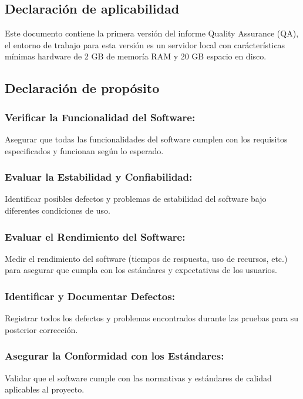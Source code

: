 \documentclass[12pt,letterpaper]{article}
\begin{document}
    \subsection{Declaración de aplicabilidad}
    
    Este documento contiene la primera versión del informe Quality Assurance (QA), el entorno de trabajo para esta versión es un servidor local con carácterísticas mínimas hardware de 2 GB de memoría RAM y 20 GB espacio en disco.
    
    \subsection{Declaración de propósito}

    \subsubsection{Verificar la Funcionalidad del Software:}
        Asegurar que todas las funcionalidades del software cumplen con los requisitos especificados y funcionan según lo esperado.
        
    \subsubsection{Evaluar la Estabilidad y Confiabilidad:}
    Identificar posibles defectos y problemas de estabilidad del software bajo diferentes condiciones de uso.
    
    \subsubsection{Evaluar el Rendimiento del Software:}
    Medir el rendimiento del software (tiempos de respuesta, uso de recursos, etc.) para asegurar que cumpla con los estándares y expectativas de los usuarios.
    
    \subsubsection{Identificar y Documentar Defectos:}
    Registrar todos los defectos y problemas encontrados durante las pruebas para su posterior corrección.
    
    \subsubsection{Asegurar la Conformidad con los Estándares:}
    Validar que el software cumple con las normativas y estándares de calidad aplicables al proyecto.
    
\end{document}
